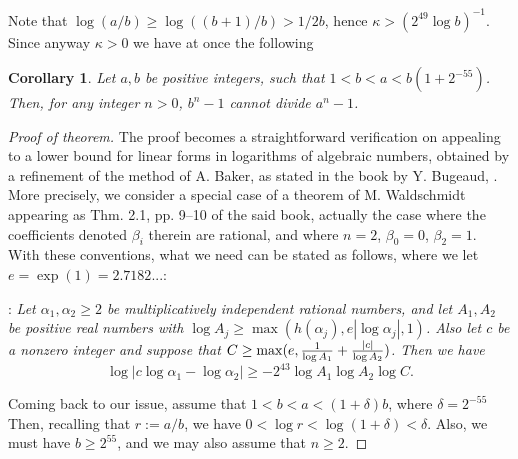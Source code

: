 \documentclass[leqno,12pt]{article} %
\theoremstyle{plain} %
\newtheorem{corollary}[theorem]{\indent\sc Corollary}
\theoremstyle{definition} %
\begin{document}
Note that $\log (a/b)\ge \log ((b+1)/b)>1/2b$, hence $\kappa> (2^{49}\log b)^{-1}$. Since anyway $\kappa>0$ we have at once the following

\begin{corollary} Let $a,b$ be positive integers, such that $1<b<a<b(1+2^{-55})$. Then, for any integer $n>0$,  $b^n-1$ cannot divide $a^n-1$.
\end{corollary}


\begin{proof} [Proof of theorem]




The proof becomes a straightforward verification on appealing to  a lower bound for linear forms in logarithms of algebraic numbers, obtained by a refinement of  the method of {\sc A. Baker},  as stated in the book by {\sc Y. Bugeaud},  \cite{Bug}.
More precisely, we consider a special case of a theorem of {\sc M. Waldschmidt } appearing as Thm. 2.1, pp. 9--10 of the said book, actually the case where the coefficients denoted $\beta_i$ therein are rational, and where $n=2$, $\beta_0=0$, $\beta_2=1$. With these conventions, what  we need can be stated as follows, where we let $e=\exp(1)=2.7182...$:

\medskip

: {\it Let $\alpha_1,\alpha_2\ge 2$ be multiplicatively independent   rational numbers, and let $A_1,A_2 $  be positive real numbers with $\log A_j\ge \max(h(\alpha_j), e|\log\alpha_j|,1)$. Also let $c$ be a nonzero integer and suppose that  $C\ge \max(e, {1\over \log A_1}+ {|c|\over \log A_2})$. Then we have
$$
\log |c\log\alpha_1-\log\alpha_2|\ge -2^{43}\log A_1\log A_2\log C.
$$}

 

Coming back to our issue,  assume that %
$1<b<a<(1+\delta)b$, where $\delta=2^{-55}$ %
Then, recalling that $r:=a/b$, we have  $0<\log r<\log (1+\delta)<\delta$. Also, we must have $b\ge 2^{55}$, and we may also assume that $n\ge 2$.



\end{proof}
\end{document}
